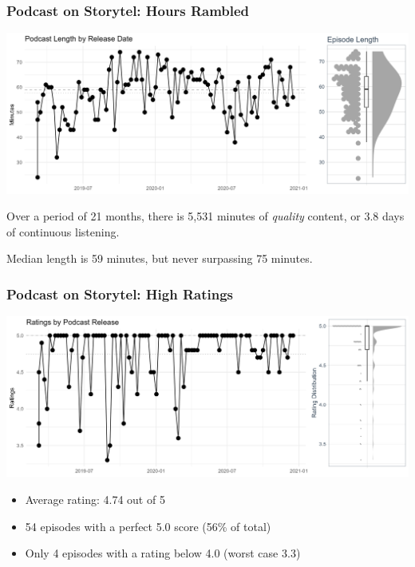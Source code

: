 \begin{frame}
    \frametitle{Podcast on Storytel: Hours Rambled}
    \includegraphics[width=\textwidth]{../R/figures/iskisur_length}

    Over a period of 21 months, there is 5,531 minutes of \emph{quality} content, or 3.8 days of continuous
    listening.

    Median length is 59 minutes, but never surpassing 75 minutes.

\end{frame}

\begin{frame}
    \frametitle{Podcast on Storytel: High Ratings}
    \includegraphics[width=\textwidth]{../R/figures/iskisur_ratings}
    \begin{itemize}
        \item Average rating: 4.74 out of 5
        \item 54 episodes with a perfect 5.0 score (56\% of total)
        \item Only 4 episodes with a rating below 4.0 (worst case 3.3)
    \end{itemize}
\end{frame}

